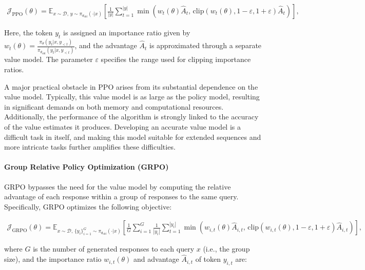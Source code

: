 \begin{align}
\mathcal{J}_\text{PPO}(\theta) = \mathbb{E}_{ x \sim \mathcal{D},\, y \sim \pi_{\theta_\text{old}}( \cdot | x) }
\left[ \frac{1}{|y|} \sum_{t=1}^{|y|} 
\min \left( w_{t}(\theta) \widehat{A}_{t},  \, \mathrm{clip} \left( w_{t}(\theta), 1 - {\varepsilon}, 1 + {\varepsilon}\right) \widehat{A}_{t} \right)
\right],
\end{align}

Here, the token $y_t$ is assigned an importance ratio given by $
w_{t}(\theta) = \frac{ \pi_{\theta} (y_{t} | x, y_{<t}) }{ \pi_{\theta_\text{old}} (y_{t} | x,y_{<t})} $, and the advantage $\widehat{A}_{t}$ is approximated through a separate value model. The parameter $\varepsilon$ specifies the range used for clipping importance ratios.

A major practical obstacle in PPO arises from its substantial dependence on the value model. Typically, this value model is as large as the policy model, resulting in significant demands on both memory and computational resources. Additionally, the performance of the algorithm is strongly linked to the accuracy of the value estimates it produces. Developing an accurate value model is a difficult task in itself, and making this model suitable for extended sequences and more intricate tasks further amplifies these difficulties.

\paragraph{Group Relative Policy Optimization (GRPO)} GRPO \citep{grpo} bypasses the need for the value model by computing the relative advantage of each response within a group of responses to the same query. Specifically, GRPO optimizes the following objective:

\begin{align}
\label{equ:grpo}
\mathcal{J}_\text{GRPO}(\theta) = \mathbb{E}_{ x \sim \mathcal{D},\, \{y_i\}_{i=1}^G \sim \pi_{\theta_\text{old}}( \cdot | x) }
\left[ \frac{1}{G} \sum_{i=1}^{G} \frac{1}{|y_i|} \sum_{t=1}^{|y_i|} 
\min \left( w_{i,t}(\theta) \widehat{A}_{i,t},  \, \mathrm{clip} \left( w_{i,t}(\theta), 1 - {\varepsilon}, 1 + {\varepsilon}\right) \widehat{A}_{i,t} \right)
\right],
\end{align}

where $G$ is the number of generated responses to each query $x$ (i.e., the group size), and the importance ratio $w_{i,t}(\theta)$ and advantage $\widehat{A}_{i,t}$ of token $y_{i,t}$ are:

